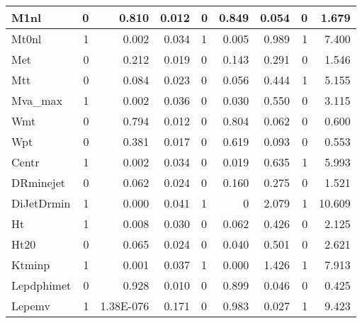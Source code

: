 \begin{landscape}
\begin{table}[h]
{\begin{tabular}{|l|r|r|r|l|r|r|r|r|}
\textsf{M1nl} & 0 & 0.810 & 0.012 & 0 & 0.849 & 0.054 & 0 & 1.679 \\ \hline
\textsf{Mt0nl} & 1 & 0.002 & 0.034 & 1 & 0.005 & 0.989 & 1 & 7.400 \\ \hline
\textsf{Met} & 0 & 0.212 & 0.019 & 0 & 0.143 & 0.291 & 0 & 1.546 \\ \hline
\textsf{Mtt} & 0 & 0.084 & 0.023 & 0 & 0.056 & 0.444 & 1 & 5.155 \\ \hline
\textsf{Mva\_max} & 1 & 0.002 & 0.036 & 0 & 0.030 & 0.550 & 0 & 3.115 \\ \hline
\textsf{Wmt} & 0 & 0.794 & 0.012 & 0 & 0.804 & 0.062 & 0 & 0.600 \\ \hline
\textsf{Wpt} & 0 & 0.381 & 0.017 & 0 & 0.619 & 0.093 & 0 & 0.553 \\ \hline
\textsf{Centr} & 1 & 0.002 & 0.034 & 0 & 0.019 & 0.635 & 1 & 5.993 \\ \hline
\textsf{DRminejet} & 0 & 0.062 & 0.024 & 0 & 0.160 & 0.275 & 0 & 1.521 \\ \hline
\textsf{DiJetDrmin} & 1 & 0.000 & 0.041 & 1 & 0 & 2.079 & 1 & 10.609 \\ \hline
\textsf{Ht} & 1 & 0.008 & 0.030 & 0 & 0.062 & 0.426 & 0 & 2.125 \\ \hline
\textsf{Ht20} & 0 & 0.065 & 0.024 & 0 & 0.040 & 0.501 & 0 & 2.621 \\ \hline
\textsf{Ktminp} & 1 & 0.001 & 0.037 & 1 & 0.000 & 1.426 & 1 & 7.913 \\ \hline
\textsf{Lepdphimet} & 0 & 0.928 & 0.010 & 0 & 0.899 & 0.046 & 0 & 0.425 \\ \hline
\textsf{Lepemv} & 1 & 1.38E-076 & 0.171 & 0 & 0.983 & 0.027 & 1 & 9.423 \\ \hline
\end{tabular}
\label{tab:e4j-tests}
}
\end{table}



\end{landscape}